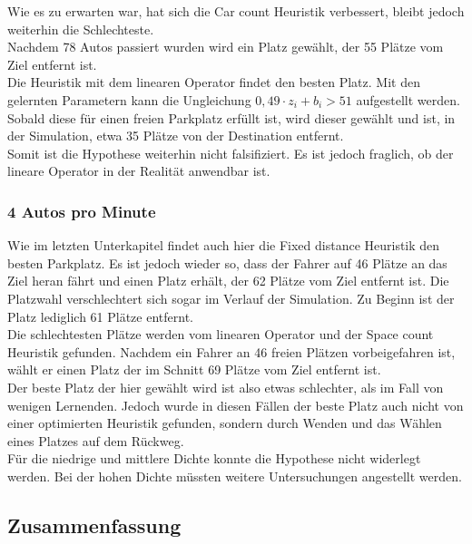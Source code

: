 Wie es zu erwarten war, hat sich die Car count Heuristik verbessert, bleibt jedoch weiterhin die Schlechteste.\\
Nachdem 78 Autos passiert wurden wird ein Platz gewählt, der 55 Plätze vom Ziel entfernt ist.\\
Die Heuristik mit dem linearen Operator findet den besten Platz. 
Mit den gelernten Parametern kann die Ungleichung $0,49\cdot z_i+b_i > 51$ aufgestellt werden. Sobald diese für einen freien Parkplatz erfüllt ist, wird dieser gewählt und ist, in der Simulation, etwa 35 Plätze von der Destination entfernt.\\
Somit ist die Hypothese weiterhin nicht falsifiziert. Es ist jedoch fraglich, ob der lineare Operator in der Realität anwendbar ist. \\

\subsubsection{4 Autos pro Minute}

Wie im letzten Unterkapitel findet auch hier die Fixed distance Heuristik den besten Parkplatz.
Es ist jedoch wieder so, dass der Fahrer auf 46 Plätze an das Ziel heran fährt und einen Platz erhält, der 62 Plätze vom Ziel entfernt ist. Die Platzwahl verschlechtert sich sogar im Verlauf der Simulation. Zu Beginn ist der Platz lediglich 61 Plätze entfernt.\\
Die schlechtesten Plätze werden vom linearen Operator %
und der Space count Heuristik gefunden.
Nachdem ein Fahrer an 46 freien Plätzen vorbeigefahren ist, wählt er einen Platz der im Schnitt 69 Plätze vom Ziel entfernt ist.\\

Der beste Platz der hier gewählt wird ist also etwas schlechter, als im Fall von wenigen Lernenden. Jedoch wurde in diesen Fällen der beste Platz auch nicht von einer optimierten Heuristik gefunden, sondern durch Wenden und das Wählen eines Platzes auf dem Rückweg.\\
Für die niedrige und mittlere Dichte konnte die Hypothese nicht widerlegt werden. Bei der hohen Dichte müssten weitere Untersuchungen angestellt werden.

\subsection{Zusammenfassung}

